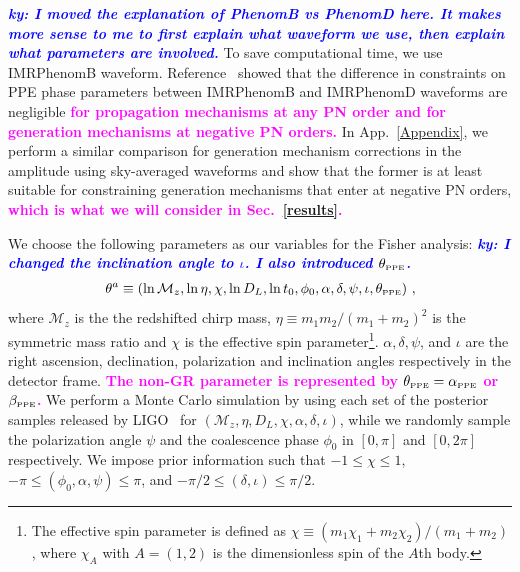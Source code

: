 \documentclass[prd,twocolumn,nofootinbib]{revtex4-1}
\newcommand\ba{\begin{eqnarray}}
\newcommand\ea{\end{eqnarray}}
\newcommand\bw{\begin{widetext}}
\newcommand\ew{\end{widetext}}
\newcommand{\lb}{\left(}
\newcommand{\rb}{\right)}
\newcommand{\PPE}{{\mbox{\tiny PPE}}}
\newcommand{\ky}[1]{\textcolor{blue}{\it{\textbf{ky: #1}}} }
\newcommand{\kent}[1]{\textcolor{magenta}{\textbf{#1}} }
\begin{document}
\ky{I moved the explanation of PhenomB vs PhenomD here. It makes more sense to me to first explain what waveform we use, then explain what parameters are involved.}
To save computational time, we use IMRPhenomB waveform. Reference~\cite{Yunes:2016jcc} showed that the difference in constraints on PPE phase parameters between IMRPhenomB and IMRPhenomD waveforms are negligible \kent{for propagation mechanisms at any PN order and for generation mechanisms at negative PN orders.}
In App.~\ref{Appendix}, we perform a similar comparison for generation mechanism corrections in the amplitude using sky-averaged waveforms and show that the former is at least suitable for constraining generation mechanisms that enter at negative PN orders, \kent{which is what we will consider in Sec.~\ref{results}.} 

We choose the following parameters as our variables for the Fisher analysis: \ky{I changed the inclination angle to $\iota$. I also introduced $\theta_\PPE$.}
\ba\label{parameters}
\theta^a\equiv \lb \ln{\mathcal{M}_z}, \ln{\eta}, \chi, \ln{D_L}, \ln{t_0},  \phi_0,\alpha, \delta, \psi, \iota, \theta_\PPE \rb\,, \nonumber \\
\ea
where $\mathcal{M}_z$ is the the redshifted chirp mass, $\eta \equiv m_1m_2/(m_1+m_2)^2$ is the symmetric mass ratio and $\chi$ is the effective spin parameter\footnote{The effective spin parameter is defined as $\chi\equiv\lb m_1 \chi_1+m_2\chi_2\rb /\lb m_1+m_2\rb$, where $\chi_A$ with $A=(1,2)$ is the dimensionless spin of the $A$th body.}. $\alpha, \delta, \psi$, and  $\iota$ are the right ascension, declination, polarization and inclination angles respectively in the detector frame. \kent{The non-GR parameter is represented by $\theta_\PPE=\alpha_{\PPE}$ or $\beta_{\PPE}$.}
We perform a Monte Carlo simulation by using each set of the posterior samples released by LIGO~\cite{ligo:sample} for $(\mathcal{M}_z, \eta, D_L, \chi, \alpha, \delta, \iota)$, while we randomly sample the polarization angle $\psi$ and the coalescence phase $\phi_0$ in $[0,\pi]$ and $[0,2\pi]$ respectively.
We impose prior information such that $-1 \leq \chi \leq 1$, $-\pi \leq (\phi_0, \alpha, \psi) \leq \pi$, and $-\pi/2 \leq ( \delta, \iota) \leq \pi/2$.
\end{document}
